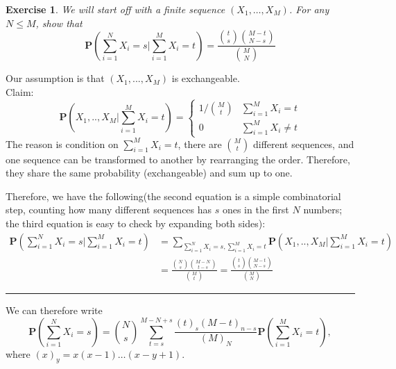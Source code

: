 \documentclass[twoside]{article}
\newcounter{lecnum}
\newtheorem{exercise}{Exercise}[lecnum]
\newenvironment{proof}{{\bf Proof:}}{\hfill\rule{2mm}{2mm}}
\newcommand\Prob{\mathbf{P}}
\begin{document}
\begin{exercise}
  We will start off with a finite sequence $(X_1,\dots, X_M)$. For any $N\leq M$, show that
  $$\Prob\left(\sum_{i=1}^N X_i = s\Big|\sum_{i=1}^M X_i = t\right) = \frac{{t\choose s}{M-t\choose N-s}}{{M \choose N}}$$
\end{exercise}

\begin{proof}
Our assumption is that $(X_1, ..., X_M)$ is exchangeable.\\
Claim:
\begin{equation}
\Prob\left(X_1, .., X_M| \sum_{i=1}^M X_i = t\right)=
\begin{cases}
1/ {M \choose t}& \sum_{i=1}^M X_i = t\\
0 & \sum_{i=1}^M X_i \neq t
\end{cases}\nonumber
\end{equation}
The reason is condition on $\sum_{i=1}^M X_i = t$, there are ${M \choose t}$ different sequences, and one sequence can be transformed to another by rearranging the order. Therefore, they share the same probability (exchangeable) and sum up to one.


Therefore, we have the following(the second equation is a simple combinatorial step, counting how many different sequences has $s$ ones in the first $N$ numbers; the third equation is easy to check by expanding both sides):
\begin{equation}
\begin{split}
\Prob\left(\sum_{i=1}^N X_i = s\Big|\sum_{i=1}^M X_i = t\right) &= \sum_{\sum_{i=1}^N X_i = s, \sum_{i=1}^M X_i = t} \Prob\left(X_1, .., X_M| \sum_{i=1}^M X_i = t\right)\\
& = \frac{{N\choose s}{M-N\choose t-s}}{{M \choose t}} = \frac{{t\choose s}{M-t\choose N-s}}{{M \choose N}}
\end{split}\nonumber
\end{equation}


\end{proof}








We can therefore write
\begin{equation}\Prob\left(\sum_{i=1}^N X_i = s\right) = {N\choose s}\sum_{t=s}^{M-N+s}\frac{(t)_s(M-t)_{n-s}}{(M)_N}\Prob\left(\sum_{i=1}^M X_i = t\right),\label{eqn:a}\end{equation}
where $(x)_y = x(x-1)\dots (x-y+1)$.
\end{document}
